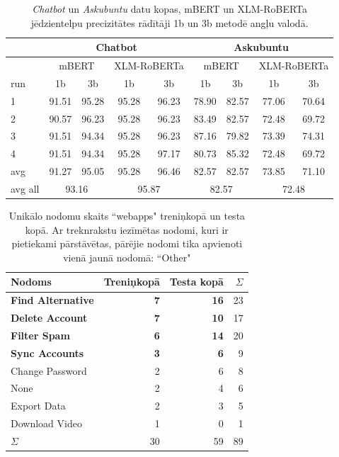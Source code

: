 \begin{table}[htbp]
  \centering
  \caption{\textit{Chatbot} un \textit{Askubuntu} datu kopas, mBERT un XLM-RoBERTa jēdzientelpu precizitātes rādītāji 1b un 3b metodē angļu valodā.}
    \begin{tabular}{l|cc|cc|cc|cc} \toprule
          & \multicolumn{4}{c|}{Chatbot}   & \multicolumn{4}{c}{Askubuntu} \\\midrule
          & \multicolumn{2}{c|}{mBERT} & \multicolumn{2}{c|}{XLM-RoBERTa} & \multicolumn{2}{c|}{mBERT} & \multicolumn{2}{c}{XLM-RoBERTa} \\
    run   & \multicolumn{1}{c}{1b} & \multicolumn{1}{c|}{3b} & \multicolumn{1}{c}{1b} & \multicolumn{1}{c|}{3b} & \multicolumn{1}{c}{1b} & \multicolumn{1}{c|}{3b} & \multicolumn{1}{c}{1b} & \multicolumn{1}{c}{3b} \\\midrule
    1     & 91.51 & 95.28 & 95.28 & 96.23 & 78.90 & 82.57 & 77.06 & 70.64 \\
    2     & 90.57 & 96.23 & 95.28 & 96.23 & 83.49 & 82.57 & 72.48 & 69.72 \\
    3     & 91.51 & 94.34 & 95.28 & 96.23 & 87.16 & 79.82 & 73.39 & 74.31 \\
    4     & 91.51 & 94.34 & 95.28 & 97.17 & 80.73 & 85.32 & 72.48 & 69.72 \\\midrule
    avg   & 91.27 & 95.05 & 95.28 & 96.46 & 82.57 & 82.57 & 73.85 & 71.10 \\
    avg all & \multicolumn{2}{c|}{93.16} & \multicolumn{2}{c|}{95.87} & \multicolumn{2}{c|}{82.57} & \multicolumn{2}{c}{72.48} \\\bottomrule
    \end{tabular}%
  \label{tab:13b}%
\end{table}%




\begin{table}[htbp]
  \centering
  \caption{Unikālo nodomu skaits ``webapps" treniņkopā un testa kopā. Ar treknrakstu iezīmētas nodomi, kuri ir pietiekami pārstāvētas, pārējie nodomi tika apvienoti vienā jaunā nodomā: “Other"}
    \begin{tabular}{lrrr} \toprule
    Nodoms & Treniņkopā & Testa kopā & $\Sigma$ \\\midrule
    \textbf{Find Alternative} & \textbf{7} & \textbf{16} & 23\\
    \textbf{Delete Account} & \textbf{7} & \textbf{10} & 17\\
    \textbf{Filter Spam} & \textbf{6} & \textbf{14} & 20 \\
    \textbf{Sync Accounts} & \textbf{3} & \textbf{6} & 9 \\
    Change Password & 2     & 6 & 8\\
    None  & 2     & 4 & 6\\
    Export Data & 2     & 3 & 5 \\
    Download Video & 1     & 0 & 1\\
    $\Sigma$ & 30    & 59 & 89 \\\bottomrule
    \end{tabular}%
  \label{tab:webapps-labels}%
\end{table}%


